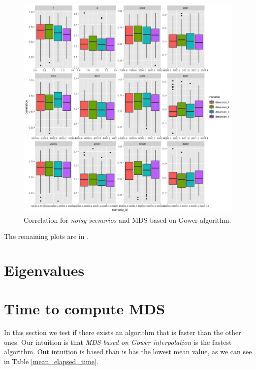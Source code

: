 \documentclass[11pt]{report}
\begin{document}
\begin{figure}[ht]
\centering
    \includegraphics{./images/gower_correlation_noise.png}
    \caption{Correlation for \textit{noisy scenarios} and MDS based on Gower algorithm.}
    \label{gower_correlation_noise}
\end{figure}

The remaining plots are in .


\section{Eigenvalues}


\section{Time to compute MDS}
In this section we test if there exists an algorithm that is faster than the
other ones. Our intuition is that \textit{MDS based on Gower interpolation} is
the fastest algorithm. Out intuition is based than is has the lowest mean
value, as we can see in Table \ref{mean_elapsed_time}.
\end{document}
